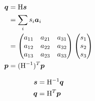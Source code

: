\documentclass[11pt,a4paper,uplatex]{jsarticle}
\begin{document}
\begin{align}
    \bm{q} &= {\rm H} \bm{s} \\
    &= \sum_{i} s_{i} \bm{a}_{i} \\
    &=          \begin{pmatrix} 
        a_{11} & a_{21} & a_{31} \\
        a_{12} & a_{22} & a_{32} \\
        a_{13} & a_{23} & a_{33} \\
    \end{pmatrix} 
    \begin{pmatrix}
        s_{1} \\ s_{2} \\ s_{3} 
    \end{pmatrix} \\
    \bm{p} &= ({\rm H}^{-1})^{T} \bm{p} 
\end{align}  

\begin{align}
    \bm{s} &= {\rm H}^{-1} \bm{q}\\
    \bm{q} &= {\rm H}^{T} \bm{p}
\end{align}
\end{document}
